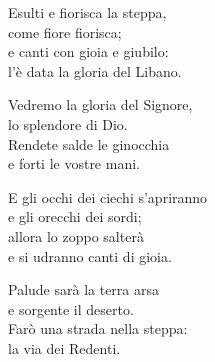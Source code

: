 

\spazio

\strofa Esulti e fiorisca la steppa,\\
come fiore fiorisca;\\
e canti con gioia e giubilo:\\
l'è data la gloria del Libano.

\spazio


\spazio

\strofa Vedremo la gloria del Signore,\\
lo splendore di Dio.\\
Rendete salde le ginocchia\\
e forti le vostre mani.

\spazio


\spazio

\strofa E gli occhi dei ciechi s'apriranno\\
e gli orecchi dei sordi;\\
allora lo zoppo salterà\\
e si udranno canti di gioia.

\spazio


\spazio

\strofa Palude sarà la terra arsa\\
e sorgente il deserto.\\
Farò una strada nella steppa:\\
la via dei Redenti.

\spazio

